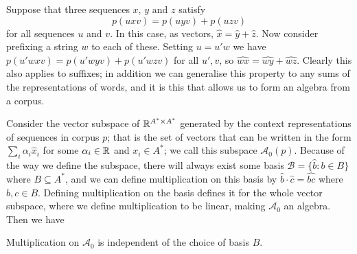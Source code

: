 \documentclass[12pt]{report}
\begin{document}
Suppose that three sequences $x$, $y$ and $z$ satisfy
$$p(uxv) = p(uyv) + p(uzv)$$
for all sequences $u$ and $v$. In this case, as vectors, $\hat{x} = \hat{y} + \hat{z}$. Now consider prefixing a string $w$ to each of these. Setting $u = u'w$ we have $p(u'wxv) = p(u'wyv) + p(u'wzv)$ for all $u',v$, so $\widehat{wx} = \widehat{wy} + \widehat{wz}$. Clearly this also applies to suffixes; in addition we can generalise this property to any sums of the representations of words, and it is this that allows us to form an algebra from a corpus.

Consider the vector subspace of $\mathbb{R}^{A^* \times A^*}$ generated by the context representations of sequences in corpus $p$; that is the set of vectors that can be written in the form $\sum_i \alpha_i \hat{x}_i$ for some $\alpha_i \in \mathbb{R}$  and $x_i \in A^*$; we call this subspace $\mathcal{A}_0(p)$. Because of the way we define the subspace, there will always exist some basis $\mathcal{B} = \{\hat{b} : b \in B\}$ where $B \subseteq A^*$, and we can define multiplication on this basis by $\hat{b}\cdot\hat{c} = \widehat{bc}$ where $b,c \in B$. Defining multiplication on the basis defines it for the whole vector subspace, where we define multiplication to be linear, making $\mathcal{A}_0$ an algebra.
Then we have
\begin{prop}
Multiplication on $\mathcal{A}_0$ is independent of the choice of basis $B$.
\end{prop}
\end{document}
